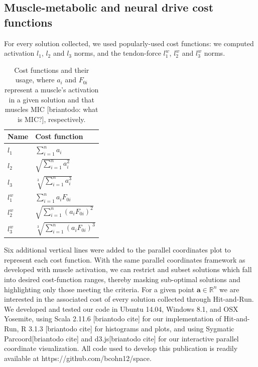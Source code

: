 \subsection{Muscle-metabolic and neural drive cost functions}

For every solution collected, we used popularly-used cost functions: we computed activation $l_1$, $l_2$ and $l_3$ norms, and the tendon-force $l_1^w$, $l_2^w$ and $l_3^w$ norms.


\begin{table}[h]
\centering
\begin{tabular}{@{}ll@{}}
\toprule
\textbf{Name} & \textbf{Cost function}  \\ \midrule
$l_1$            & $\sum_{i=1}^n a_i$                                     \\
$l_2$            & $\sqrt{\sum_{i=1}^n a_i^2}$                                    \\
$l_3$            & $\sqrt[3]{\sum_{i=1}^n a_i^3}$                                   \\
$l_1^w$            & $\sum_{i=1}^n a_i F_{0i}$                                    \\
$l_2^w$            & $\sqrt{\sum_{i=1}^n (a_i F_{0i})^2}$                                  \\
$l_3^w$            & $\sqrt[3]{\sum_{i=1}^n (a_i F_{0i})^3}$                                    \\ \bottomrule
\end{tabular}
\caption{Cost functions and their usage, where $a_i$ and $F_{0i}$ represent a muscle's activation in a given solution and that muscles MIC [briantodo: what is MIC?], respectively.}
\label{cost_function_tabls}
\end{table}

Six additional vertical lines were added to the parallel coordinates plot to represent each cost function. With the same parallel coordinates framework as developed with muscle activation, we can restrict and subset solutions which fall into desired cost-function ranges, thereby masking sub-optimal solutions and highlighting only those meeting the criteria.
For a given point $\textbf{a} \in \mathbb{R}^n$ we are interested in the associated cost of every solution collected through Hit-and-Run.
We developed and tested our code in  Ubuntu 14.04, Windows 8.1, and OSX Yosemite, using Scala 2.11.6 [briantodo cite] for our implementation of Hit-and-Run, R 3.1.3 [briantodo cite] for histograms and plots, and using Sygmatic Parcoord[briantodo cite] and d3.js[briantodo cite] for our interactive parallel coordinate visualization. All code used to develop this publication is readily available at https://github.com/bcohn12/space.